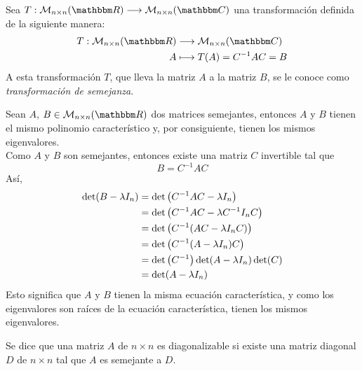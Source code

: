 \begin{definition}
    Sea $T: \mathcal{M}_{n \times n}(\RR) \longrightarrow \mathcal{M}_{n \times n}(\CC)$ una transformación definida de la siguiente manera:
    \begin{align*}
        T: \mathcal{M}_{n \times n}(\RR) & \longrightarrow \mathcal{M}_{n \times n}(\CC) \\
        A & \longmapsto T(A) = C^{-1} A C = B
    \end{align*}
    A esta transformación $T$, que lleva la matriz $A$ a la matriz $B$, se le conoce como \emph{transformación de semejanza}.
\end{definition}

\newpage

\begin{theorem}
    Sean $A$, $B \in \mathcal{M}_{n \times n}(\RR)$ dos matrices semejantes, entonces $A$ y $B$ tienen el mismo polinomio característico y, por consiguiente, tienen los mismos eigenvalores. \\
    \demostracion Como $A$ y $B$ son semejantes, entonces existe una matriz $C$ invertible tal que
    $$B = C^{-1}AC$$
    Así,
    \begin{align*}
        \operatorname{det}(B - \lambda I_n) & = \operatorname{det}\left(C^{-1}AC - \lambda I_n\right) \\
        & = \operatorname{det}\left(C^{-1}AC - \lambda C^{-1}I_nC\right) \\
        & = \operatorname{det}\left(C^{-1}(AC - \lambda I_nC)\right) \\
        & = \operatorname{det}\left(C^{-1}(A - \lambda I_n)C\right) \\
        & = \operatorname{det}\left(C^{-1}\right) \operatorname{det}(A - \lambda I_n) \operatorname{det}(C) \\
        & = \operatorname{det}(A - \lambda I_n)
    \end{align*}
    Esto significa que $A$ y $B$ tienen la misma ecuación característica, y como los eigenvalores son raíces de la ecuación característica, tienen los mismos eigenvalores.
\end{theorem}

\begin{definition}
    Se dice que una matriz $A$ de $n \times n$ es diagonalizable si existe una matriz diagonal $D$ de $n \times n$ tal que $A$ es semejante a $D$.
\end{definition}


